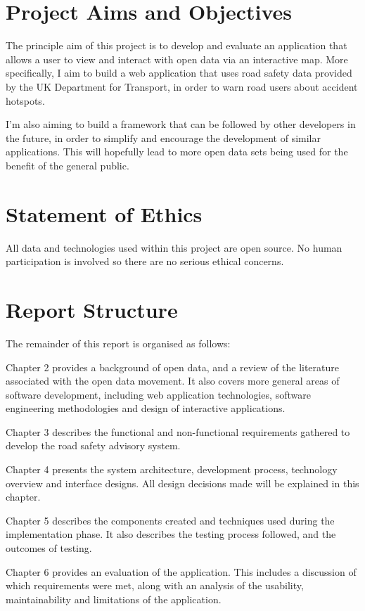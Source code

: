 \documentclass[authoryearcitations]{UoYCSproject}
\begin{document}
\section{Project Aims and Objectives}

The principle aim of this project is to develop and evaluate an application that allows a user to view and interact with open data via an interactive map. More specifically, I aim to build a web application that uses road safety data provided by the UK Department for Transport, in order to warn road users about accident hotspots.

I'm also aiming to build a framework that can be followed by other developers in the future, in order to simplify and encourage the development of similar applications. This will hopefully lead to more open data sets being used for the benefit of the general public.

\section{Statement of Ethics}

All data and technologies used within this project are open source. No human participation is involved so there are no serious ethical concerns.

\section{Report Structure}
The remainder of this report is organised as follows:

Chapter 2 provides a background of open data, and a review of the literature associated with the open data movement. It also covers more general areas of software development, including web application technologies, software engineering methodologies and design of interactive applications.

Chapter 3 describes the functional and non-functional requirements gathered to develop the road safety advisory system.

Chapter 4 presents the system architecture, development process, technology overview and interface designs. All design decisions made will be explained in this chapter.

Chapter 5 describes the components created and techniques used during the implementation phase. It also describes the testing process followed, and the outcomes of testing.

Chapter 6 provides an evaluation of the application. This includes a discussion of which requirements were met, along with an analysis of the usability, maintainability and limitations of the application.
\end{document}
